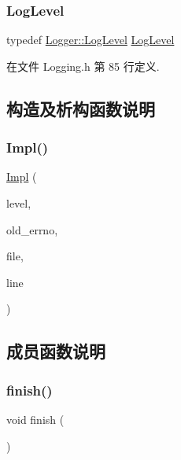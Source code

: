 \subsubsection{\texorpdfstring{Log\+Level}{LogLevel}}
{\footnotesize\ttfamily typedef \hyperlink{classmuduo_1_1Logger_aca1fd1d8935433e6ba2e3918214e07f9}{Logger\+::\+Log\+Level} \hyperlink{classmuduo_1_1Logger_aca1fd1d8935433e6ba2e3918214e07f9}{Log\+Level}}



在文件 Logging.\+h 第 85 行定义.



\subsection{构造及析构函数说明}
\mbox{\label{classmuduo_1_1Logger_1_1Impl_a7c5ab4809227d6e7f68d59795830ac9e}} 
\subsubsection{\texorpdfstring{Impl()}{Impl()}}
{\footnotesize\ttfamily \hyperlink{classmuduo_1_1Logger_1_1Impl}{Impl} (\begin{DoxyParamCaption}\item[{\hyperlink{classmuduo_1_1Logger_aca1fd1d8935433e6ba2e3918214e07f9}{Log\+Level}}]{level,  }\item[{int}]{old\+\_\+errno,  }\item[{const \hyperlink{classmuduo_1_1Logger_1_1SourceFile}{Source\+File} \&}]{file,  }\item[{int}]{line }\end{DoxyParamCaption})}



\subsection{成员函数说明}
\mbox{\label{classmuduo_1_1Logger_1_1Impl_a6dfe1abe0d1eb3ddc1ca081de98b5342}} 
\subsubsection{\texorpdfstring{finish()}{finish()}}
{\footnotesize\ttfamily void finish (\begin{DoxyParamCaption}{ }\end{DoxyParamCaption})}

